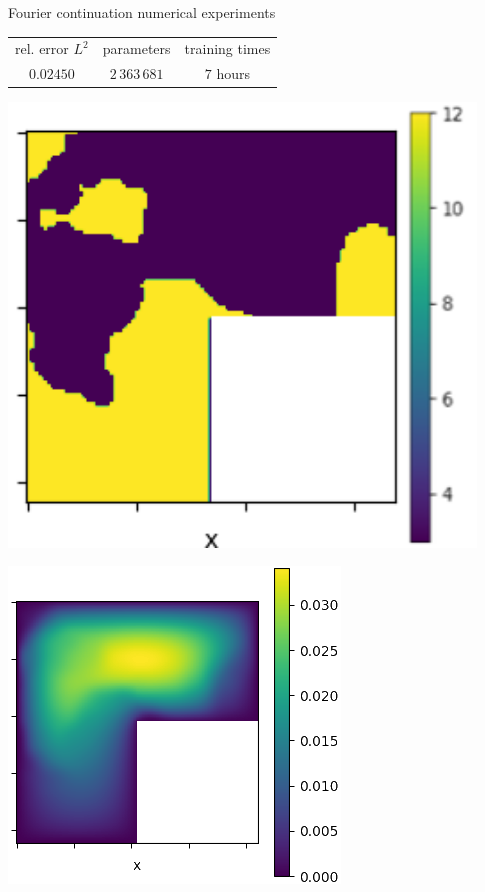 \documentclass{beamer}
\begin{document}
\begin{frame}{Fourier continuation numerical experiments}
	\begin{table}[h!] %
		\centering
		\begin{tabular}{ccc}\toprule
		rel. error $ L^2 $ & parameters & training times\\
			\cmidrule{1-3}
			$ 0.02450 $ & $ 2\, 363\, 681 $ & $ 7 $ hours\\
			\bottomrule
		\end{tabular}
	\end{table}
	\begin{center}
        \begin{minipage}{0.24\textwidth}
            \includegraphics[width=0.93\textwidth]{FNO_continuation_input.png}
        \end{minipage}
        \hfill
        \begin{minipage}{0.24\textwidth}
            \includegraphics[width=\textwidth]{FNO_continuation_output.png}

\end{minipage}
\end{center}
\end{frame}
\end{document}
